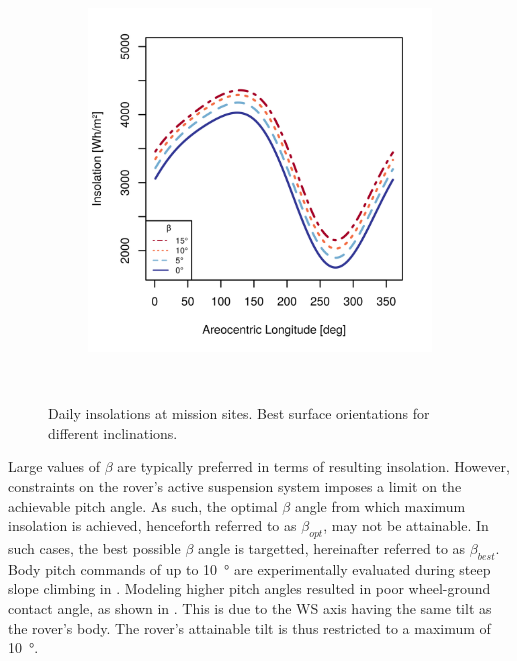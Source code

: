 \begin{figure}[h]
\begin{subfigure}[t]{\subfigureWidth}
            \includegraphics[height=\graphicsHeight]{sections/mars-solar-energy/mission-sites/plots/ismenius-cavus-solar-insolations-for-different-beta-inclinations.png}
            \label{fig:plot:sub:solar-insolations-for-different-beta-ismenius-cavus}
    \end{subfigure}\\[0.8ex]
    \caption[Daily insolations at mission sites]
    {Daily insolations at mission sites. Best surface orientations for different inclinations.}
    \label{fig:plot:solar-insolations-for-different-beta}
\vspace{-2ex}
\end{figure}

Large values of $\beta$ are typically preferred in terms of resulting insolation. However, constraints on the rover's active suspension system imposes a limit on the achievable pitch angle. As such, the optimal $\beta$ angle from which maximum insolation is achieved, henceforth referred to as $\beta_{opt}$, may not be attainable. In such cases, the best possible $\beta$ angle is targetted, hereinafter referred to as $\beta_{best}$. Body pitch commands of up to \SI{10}{\degree} are experimentally evaluated during steep slope climbing in . Modeling higher pitch angles resulted in poor wheel-ground contact angle, as shown in . This is due to the \ac{WS} axis having the same tilt as the rover's body. The rover's attainable tilt is thus restricted to a maximum of \SI{10}{\degree}.


